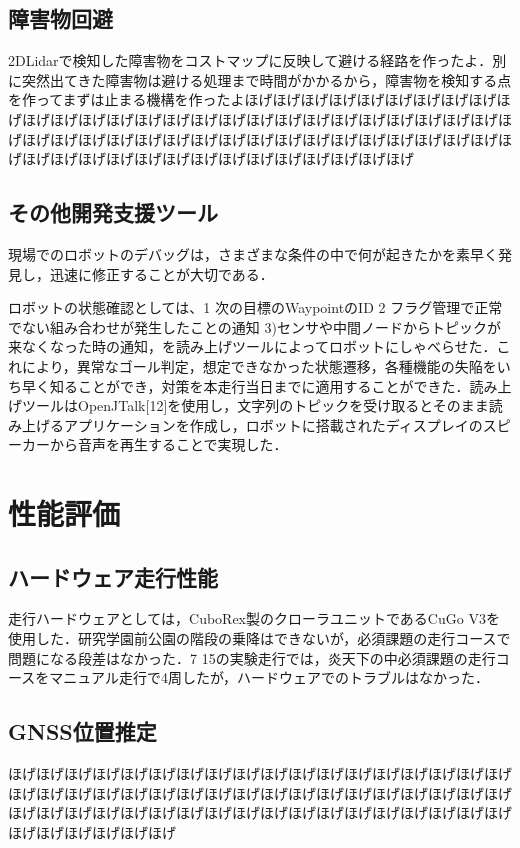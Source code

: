 \documentclass[platex,dvipdfmx]{rbproceedings}
\begin{document}
\subsection{障害物回避}
2DLidarで検知した障害物をコストマップに反映して避ける経路を作ったよ．別に突然出てきた障害物は避ける処理まで時間がかかるから，障害物を検知する点を作ってまずは止まる機構を作ったよほげほげほげほげほげほげほげほげほげほげほげほげほげほげほげほげほげほげほげほげほげほげほげほげほげほげほげほげほげほげほげほげほげほげほげほげほげほげほげほげほげほげほげほげほげほげほげほげほげほげほげほげほげほげほげほげほげほげほげほげ

\subsection{その他開発支援ツール}
現場でのロボットのデバッグは，さまざまな条件の中で何が起きたかを素早く発見し，迅速に修正することが大切である．

ロボットの状態確認としては、1  次の目標のWaypointのID 2  フラグ管理で正常でない組み合わせが発生したことの通知 3)センサや中間ノードからトピックが来なくなった時の通知，を読み上げツールによってロボットにしゃべらせた．これにより，異常なゴール判定，想定できなかった状態遷移，各種機能の失陥をいち早く知ることができ，対策を本走行当日までに適用することができた．読み上げツールはOpenJTalk[12]を使用し，文字列のトピックを受け取るとそのまま読み上げるアプリケーションを作成し，ロボットに搭載されたディスプレイのスピーカーから音声を再生することで実現した．

\section{性能評価}
\subsection{ハードウェア走行性能}
走行ハードウェアとしては，CuboRex製のクローラユニットであるCuGo V3を使用した．研究学園前公園の階段の乗降はできないが，必須課題の走行コースで問題になる段差はなかった．7 15の実験走行では，炎天下の中必須課題の走行コースをマニュアル走行で4周したが，ハードウェアでのトラブルはなかった．

\subsection{GNSS位置推定}
ほげほげほげほげほげほげほげほげほげほげほげほげほげほげほげほげほげほげほげほげほげほげほげほげほげほげほげほげほげほげほげほげほげほげほげほげほげほげほげほげほげほげほげほげほげほげほげほげほげほげほげほげほげほげほげほげほげほげほげほげ
\end{document}
